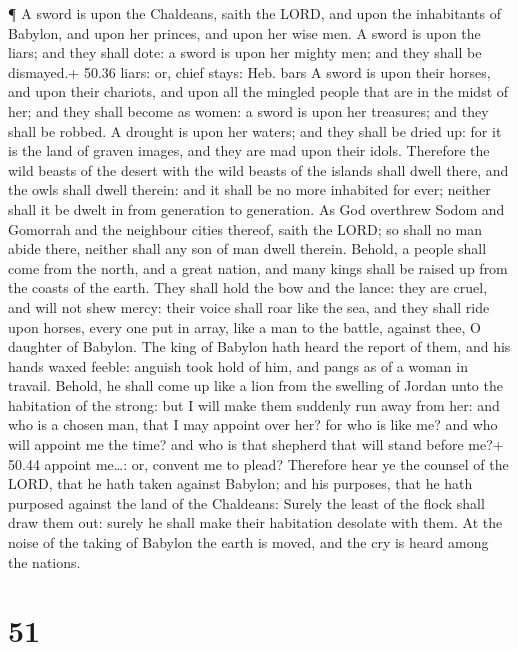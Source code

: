  ¶ A sword is upon the Chaldeans, saith the LORD, and upon
the inhabitants of Babylon, and upon her princes, and upon her wise men.
 A sword is upon the liars; and they shall dote: a sword is
upon her mighty men; and they shall be dismayed.+ 50.36 liars: or, chief
stays: Heb. bars  A sword is upon their horses, and upon
their chariots, and upon all the mingled people that are in the midst of
her; and they shall become as women: a sword is upon her treasures; and
they shall be robbed.  A drought is upon her waters; and
they shall be dried up: for it is the land of graven images, and they
are mad upon their idols.  Therefore the wild beasts of the
desert with the wild beasts of the islands shall dwell there, and the
owls shall dwell therein: and it shall be no more inhabited for ever;
neither shall it be dwelt in from generation to generation.
 As God overthrew Sodom and Gomorrah and the neighbour
cities thereof, saith the LORD; so shall no man abide there, neither
shall any son of man dwell therein.  Behold, a people shall
come from the north, and a great nation, and many kings shall be raised
up from the coasts of the earth.  They shall hold the bow
and the lance: they are cruel, and will not shew mercy: their voice
shall roar like the sea, and they shall ride upon horses, every one put
in array, like a man to the battle, against thee, O daughter of Babylon.
 The king of Babylon hath heard the report of them, and his
hands waxed feeble: anguish took hold of him, and pangs as of a woman in
travail.  Behold, he shall come up like a lion from the
swelling of Jordan unto the habitation of the strong: but I will make
them suddenly run away from her: and who is a chosen man, that I may
appoint over her? for who is like me? and who will appoint me the time?
and who is that shepherd that will stand before me?+ 50.44 appoint
me\ldots: or, convent me to plead?  Therefore hear ye the
counsel of the LORD, that he hath taken against Babylon; and his
purposes, that he hath purposed against the land of the Chaldeans:
Surely the least of the flock shall draw them out: surely he shall make
their habitation desolate with them.  At the noise of the
taking of Babylon the earth is moved, and the cry is heard among the
nations.

\hypertarget{section-50}{%
\section{51}\label{section-50}}

